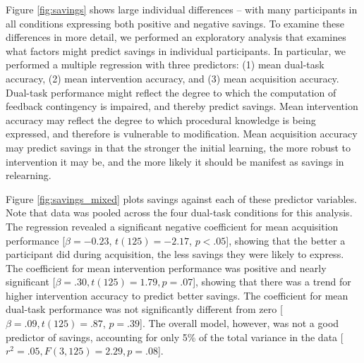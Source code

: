 \documentclass[man,apacite,draftfirst]{apa6} \usepackage{amsmath}
\begin{document}
Figure \ref{fig:savings} shows large individual differences -- with many
participants in all conditions expressing both positive and negative savings. To
examine these differences in more detail, we performed an exploratory analysis
that examines what factors might predict savings in individual participants. In
particular, we performed a multiple regression with three predictors: (1) mean
dual-task accuracy, (2) mean intervention accuracy, and (3) mean acquisition
accuracy. Dual-task performance might reflect the degree to which the
computation of feedback contingency is impaired, and thereby predict savings.
Mean intervention accuracy may reflect the degree to which procedural knowledge
is being expressed, and therefore is vulnerable to modification. Mean
acquisition accuracy may predict savings in that the stronger the initial
learning, the more robust to intervention it may be, and the more likely it
should be manifest as savings in relearning.

Figure \ref{fig:savings_mixed} plots savings against each of these predictor
variables. Note that data was pooled across the four dual-task conditions for
this analysis. The regression revealed a significant negative coefficient for
mean acquisition performance [$\beta=-0.23$, $t(125)=-2.17$, $p<.05$], showing
that the better a participant did during acquisition, the less savings they were
likely to express. The coefficient for mean intervention performance was
positive and nearly significant [$\beta=.30, t(125)=1.79, p=.07$], showing that
there was a trend for higher intervention accuracy to predict better savings.
The coefficient for mean dual-task performance was not significantly different
from zero [$\beta=.09, t(125)=.87$, $p=.39$]. The overall model, however, was
not a good predictor of savings, accounting for only 5\% of the total variance
in the data [$r^2=.05, F(3,125)=2.29, p=.08$].
\end{document}
